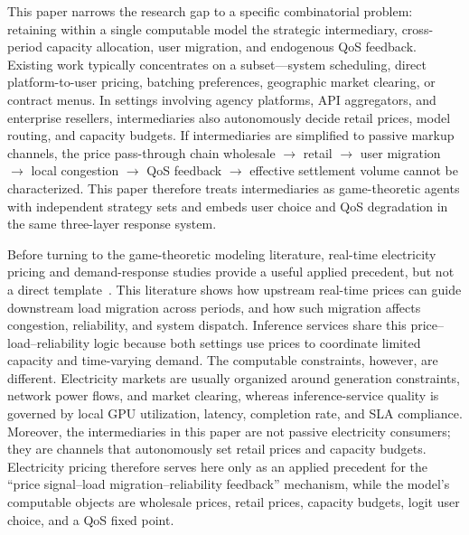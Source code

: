 \documentclass[11pt,a4paper]{article}
\begin{document}
This paper narrows the research gap to a specific combinatorial problem: retaining within a single computable model the strategic intermediary, cross-period capacity allocation, user migration, and endogenous QoS feedback. Existing work typically concentrates on a subset---system scheduling, direct platform-to-user pricing, batching preferences, geographic market clearing, or contract menus. In settings involving agency platforms, API aggregators, and enterprise resellers, intermediaries also autonomously decide retail prices, model routing, and capacity budgets. If intermediaries are simplified to passive markup channels, the price pass-through chain wholesale $\to$ retail $\to$ user migration $\to$ local congestion $\to$ QoS feedback $\to$ effective settlement volume cannot be characterized. This paper therefore treats intermediaries as game-theoretic agents with independent strategy sets and embeds user choice and QoS degradation in the same three-layer response system.

Before turning to the game-theoretic modeling literature, real-time electricity pricing and demand-response studies provide a useful applied precedent, but not a direct template~\cite{schweppe1988spot,borenstein2005long,albadi2008summary,faruqui2010household,siano2014demand}. This literature shows how upstream real-time prices can guide downstream load migration across periods, and how such migration affects congestion, reliability, and system dispatch. Inference services share this price--load--reliability logic because both settings use prices to coordinate limited capacity and time-varying demand. The computable constraints, however, are different. Electricity markets are usually organized around generation constraints, network power flows, and market clearing, whereas inference-service quality is governed by local GPU utilization, latency, completion rate, and SLA compliance. Moreover, the intermediaries in this paper are not passive electricity consumers; they are channels that autonomously set retail prices and capacity budgets. Electricity pricing therefore serves here only as an applied precedent for the ``price signal--load migration--reliability feedback'' mechanism, while the model's computable objects are wholesale prices, retail prices, capacity budgets, logit user choice, and a QoS fixed point.
\end{document}
